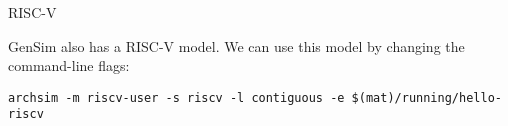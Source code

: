 \begin{frame}[fragile]{RISC-V}

GenSim also has a RISC-V model. We can use this model by changing the 
command-line flags:

\begin{lstlisting}[basicstyle=\ttfamily\ssmall]
archsim -m riscv-user -s riscv -l contiguous -e $(mat)/running/hello-riscv
\end{lstlisting}

\end{frame}
